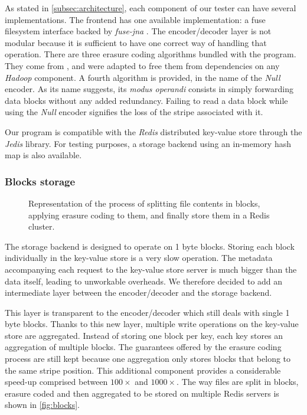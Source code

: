 As stated in \autoref{subsec:architecture}, each component of our tester can have several implementations.
The frontend has one available implementation: a \ac{fuse} filesystem interface backed by \textit{fuse-jna} \autocite{fuse-jna}.
The encoder/decoder layer is not modular because it is sufficient to have one correct way of handling that operation.
There are three erasure coding algorithms bundled with the program.
They come from \autocite{XorbasVLDB}, and were adapted to free them from dependencies on any \textit{Hadoop} component.
A fourth algorithm is provided, in the name of the \textit{Null} encoder.
As its name suggests, its \textit{modus operandi} consists in simply forwarding data blocks without any added redundancy.
Failing to read a data block while using the \textit{Null} encoder signifies the loss of the stripe associated with it.

Our program is compatible with the \textit{Redis} distributed key-value store through the \textit{Jedis} library.
For testing purposes, a storage backend using an in-memory hash map is also available.

\subsubsection{Blocks storage}

\begin{figure}[H]
    \centering
    
    \caption{Representation of the process of splitting file contents in blocks, applying erasure coding to them, and finally store them in a Redis cluster.}
    \label{fig:blocks}
\end{figure}

The storage backend is designed to operate on 1 byte blocks.
Storing each block individually in the key-value store is a very slow operation.
The metadata accompanying each request to the key-value store server is much bigger than the data itself, leading to unworkable overheads.
We therefore decided to add an intermediate layer between the encoder/decoder and the storage backend.

This layer is transparent to the encoder/decoder which still deals with single 1 byte blocks.
Thanks to this new layer, multiple write operations on the key-value store are aggregated.
Instead of storing one block per key, each key stores an aggregation of multiple blocks.
The guarantees offered by the erasure coding process are still kept because one aggregation only stores blocks that belong to the same stripe position.
This additional component provides a considerable speed-up comprised between $100\times$ and $1000\times$.
The way files are split in blocks, erasure coded and then aggregated to be stored on multiple Redis servers is shown in \autoref{fig:blocks}.

